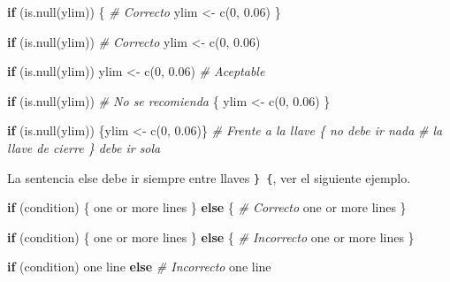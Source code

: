 \documentclass[
]{book}
\makeatletter
\newenvironment{Shaded}{\begin{snugshade}}{\end{snugshade}}
\newcommand{\CommentTok}[1]{\textcolor[rgb]{0.56,0.35,0.01}{\textit{#1}}}
\newcommand{\ControlFlowTok}[1]{\textcolor[rgb]{0.13,0.29,0.53}{\textbf{#1}}}
\newcommand{\DecValTok}[1]{\textcolor[rgb]{0.00,0.00,0.81}{#1}}
\newcommand{\FloatTok}[1]{\textcolor[rgb]{0.00,0.00,0.81}{#1}}
\newcommand{\FunctionTok}[1]{\textcolor[rgb]{0.00,0.00,0.00}{#1}}
\newcommand{\NormalTok}[1]{#1}
\newcommand{\OtherTok}[1]{\textcolor[rgb]{0.56,0.35,0.01}{#1}}
\newenvironment{kframe}{%
\medskip{}
\setlength{\fboxsep}{.8em}
 \def\at@end@of@kframe{}%
 \ifinner\ifhmode%
  \def\at@end@of@kframe{\end{minipage}}%
  \begin{minipage}{\columnwidth}%
 \fi\fi%
 \def\FrameCommand##1{\hskip\@totalleftmargin \hskip-\fboxsep
 \colorbox{shadecolor}{##1}\hskip-\fboxsep
     \hskip-\linewidth \hskip-\@totalleftmargin \hskip\columnwidth}%
 \MakeFramed {\advance\hsize-\width
   \@totalleftmargin\z@ \linewidth\hsize
   \@setminipage}}%
 {\par\unskip\endMakeFramed%
 \at@end@of@kframe}
\renewenvironment{Shaded}{\begin{kframe}}{\end{kframe}}
\makeatother
\begin{document}
\begin{Shaded}
\begin{Highlighting}[]
\ControlFlowTok{if}\NormalTok{ (}\FunctionTok{is.null}\NormalTok{(ylim)) \{                     }\CommentTok{\# Correcto}
\NormalTok{  ylim }\OtherTok{\textless{}{-}} \FunctionTok{c}\NormalTok{(}\DecValTok{0}\NormalTok{, }\FloatTok{0.06}\NormalTok{)}
\NormalTok{\}}

\ControlFlowTok{if}\NormalTok{ (}\FunctionTok{is.null}\NormalTok{(ylim))                       }\CommentTok{\# Correcto}
\NormalTok{  ylim }\OtherTok{\textless{}{-}} \FunctionTok{c}\NormalTok{(}\DecValTok{0}\NormalTok{, }\FloatTok{0.06}\NormalTok{)}

\ControlFlowTok{if}\NormalTok{ (}\FunctionTok{is.null}\NormalTok{(ylim)) ylim }\OtherTok{\textless{}{-}} \FunctionTok{c}\NormalTok{(}\DecValTok{0}\NormalTok{, }\FloatTok{0.06}\NormalTok{)    }\CommentTok{\# Aceptable}

\ControlFlowTok{if}\NormalTok{ (}\FunctionTok{is.null}\NormalTok{(ylim))                       }\CommentTok{\# No se recomienda}
\NormalTok{\{        }
\NormalTok{  ylim }\OtherTok{\textless{}{-}} \FunctionTok{c}\NormalTok{(}\DecValTok{0}\NormalTok{, }\FloatTok{0.06}\NormalTok{)}
\NormalTok{\}}
    
\ControlFlowTok{if}\NormalTok{ (}\FunctionTok{is.null}\NormalTok{(ylim)) \{ylim }\OtherTok{\textless{}{-}} \FunctionTok{c}\NormalTok{(}\DecValTok{0}\NormalTok{, }\FloatTok{0.06}\NormalTok{)\}}
\CommentTok{\# Frente a la llave \{ no debe ir nada}
\CommentTok{\# la llave de cierre \} debe ir sola}
\end{Highlighting}
\end{Shaded}

La sentencia else debe ir siempre entre llaves \texttt{\}\ \{}, ver el siguiente ejemplo.

\begin{Shaded}
\begin{Highlighting}[]
\ControlFlowTok{if}\NormalTok{ (condition) \{         }
\NormalTok{  one or more lines}
\NormalTok{\} }\ControlFlowTok{else}\NormalTok{ \{                 }\CommentTok{\# Correcto}
\NormalTok{  one or more lines}
\NormalTok{\}}


\ControlFlowTok{if}\NormalTok{ (condition) \{         }
\NormalTok{  one or more lines}
\NormalTok{\}}
\ControlFlowTok{else}\NormalTok{ \{                   }\CommentTok{\# Incorrecto}
\NormalTok{  one or more lines}
\NormalTok{\}}


\ControlFlowTok{if}\NormalTok{ (condition)           }
\NormalTok{  one line}
\ControlFlowTok{else}                     \CommentTok{\# Incorrecto}
\NormalTok{  one line}
\end{Highlighting}
\end{Shaded}
\end{document}
